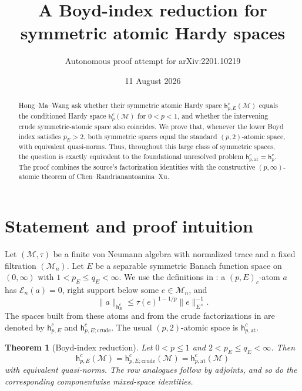 \documentclass[11pt]{article}
\title{A Boyd-index reduction for symmetric atomic Hardy spaces}
\author{Autonomous proof attempt for arXiv:2201.10219}
\date{11 August 2026}
\newtheorem{theorem}{Theorem}
\newcommand{\M}{\mathcal M}
\newcommand{\E}{\mathcal E}
\newcommand{\hpat}{\mathsf h^c_{p,\mathrm{at}}}
\newcommand{\tr}{\tau}
\begin{document}
\maketitle

\begin{abstract}
Hong--Ma--Wang ask whether their symmetric atomic Hardy space
$\mathsf h^c_{p,E}(\M)$ equals the conditioned Hardy space $\mathsf h^c_p(\M)$
for $0<p<1$, and whether the intervening crude symmetric-atomic space also
coincides.  We prove that, whenever the lower Boyd index satisfies $p_E>2$,
both symmetric spaces equal the standard $(p,2)$-atomic space, with equivalent
quasi-norms.  Thus, throughout this large class of symmetric spaces, the
question is exactly equivalent to the foundational unresolved problem
$\mathsf h^c_{p,\mathrm{at}}=\mathsf h^c_p$.  The proof combines the source's
factorization identities with the constructive $(p,\infty)$-atomic theorem of
Chen--Randrianantoanina--Xu.
\end{abstract}

\section{Statement and proof intuition}

Let $(\M,\tr)$ be a finite von Neumann algebra with normalized trace and a
fixed filtration $(\M_n)$.  Let $E$ be a separable symmetric Banach function
space on $(0,\infty)$ with $1<p_E\le q_E<\infty$.  We use the definitions in
\cite{HMW}: a $(p,E)_c$-atom $a$ has $\E_n(a)=0$, right support below some
$e\in\M_n$, and
\begin{equation}\label{eq:Eatom}
 \|a\|_{\mathsf h_E^c}
 \le \tr(e)^{1-1/p}\|e\|_{E^\times}^{-1}.
\end{equation}
The spaces built from these atoms and from the crude factorizations in
\cite[Remark 4.13]{HMW} are denoted by $\mathsf h^c_{p,E}$ and
$\mathsf h^c_{p,E;\mathrm{crude}}$.  The usual $(p,2)$-atomic space is
$\hpat$.

\begin{theorem}[Boyd-index reduction]\label{thm:main}
Let $0<p\le1$ and $2<p_E\le q_E<\infty$.  Then
\[
 \mathsf h^c_{p,E}(\M)
 =\mathsf h^c_{p,E;\mathrm{crude}}(\M)
 =\mathsf h^c_{p,\mathrm{at}}(\M)
\]
with equivalent quasi-norms.  The row analogues follow by adjoints, and so do
the corresponding componentwise mixed-space identities.
\end{theorem}
\end{document}
